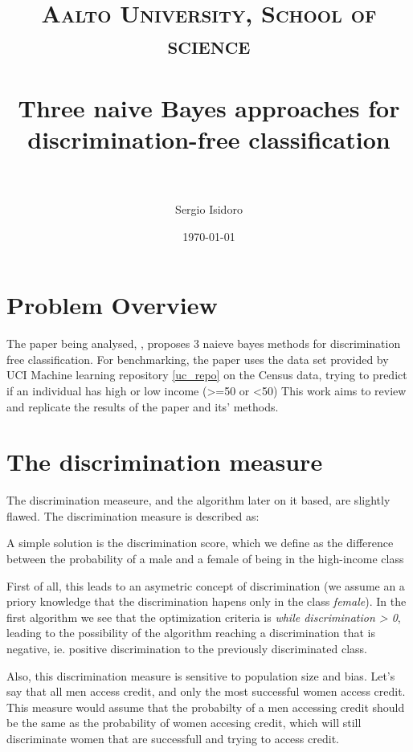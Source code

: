 \documentclass[paper=a4, fontsize=11pt]{scrartcl} %
\title{	
\normalfont \normalsize 
\textsc{Aalto University, School of science} \\ [25pt] %
\horrule{0.5pt} \\[0.4cm] %
\huge  Three naive Bayes approaches for discrimination-free classification \\ %
\horrule{2pt} \\[0.5cm] %
}
\author{Sergio Isidoro} %
\date{\normalsize\today} %
\numberwithin{equation}{section} %
\numberwithin{figure}{section} %
\numberwithin{table}{section} %
\begin{document}
\maketitle %


\section{Problem Overview}

The paper being analysed, , proposes 3 naieve bayes methods for discrimination free classification. For benchmarking, the paper uses the data set provided by UCI Machine learning repository \ref{uc_repo} on the Census data, trying to predict if an individual has high or low income (>=50 or <50)
This work aims to review and replicate the results of the paper and its' methods.

\section{The discrimination measure}

The discrimination measeure, and the algorithm later on it based, are slightly flawed. The discrimination measure is described as:
\begin{displayquote}
A simple solution is the discrimination score, which we define as the difference between the probability of a male and a female of being in the high-income class
\end{displayquote}
First of all, this leads to an asymetric concept of discrimination (we assume an a priory knowledge that the discrimination hapens only in the class \textit{female}). In the first algorithm we see that the optimization criteria is \textit{while discrimination > 0}, leading to the possibility of the algorithm reaching a discrimination that is negative, ie. positive discrimination to the previously discriminated class.
 
Also, this discrimination measure is sensitive to population size and bias. Let's say that all men access credit, and only the most successful women access credit. This measure would assume that the probabilty of a men accessing credit should be the same as the probability of women accesing credit, which will still discriminate women that are successfull and trying to access credit. 
\end{document}
